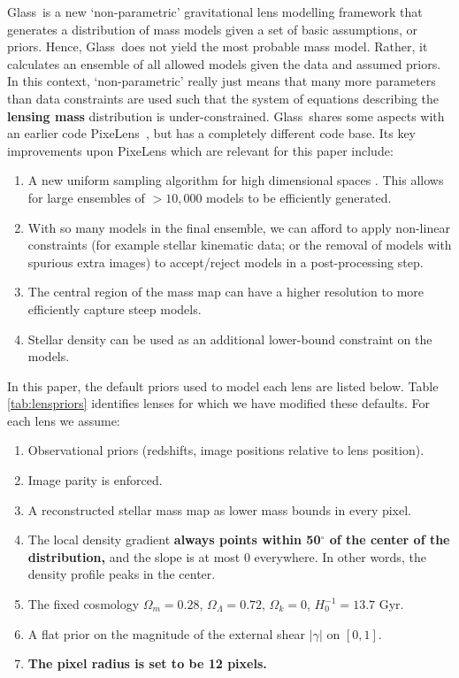 \documentclass[useAMS,usenatbib]{mn2e}
\def\Glass{{\sc Glass}}
\def\PixeLens{{\sc PixeLens}}
\newcommand{\cb}[1]{{\color{red} \textbf{#1}}}
\begin{document}
\Glass\ is a new `non-parametric' gravitational lens modelling framework \citep{2014arXiv1401.7990C} that generates a distribution of mass models given a set of basic assumptions, or priors. Hence, \Glass\ does not yield the most probable mass model. Rather, it calculates an ensemble of all allowed models given the data and assumed priors. In this context, `non-parametric' really just means that many more parameters than data constraints are used such that the system of equations describing the \cb{lensing mass} distribution is under-constrained. \Glass\ shares some aspects with an earlier code \PixeLens\ \citep{2004AJ....127.2604S,2008ApJ...679...17C}, but has a completely different code base. Its key improvements upon \PixeLens{} which are relevant for this paper include:

\begin{enumerate}
\item A new uniform sampling algorithm for high dimensional spaces \citep{2012MNRAS.425.3077L}. This allows for large ensembles of $>10,000$ models to be efficiently generated. 
\item With so many models in the final ensemble, we can afford to apply non-linear constraints (for example stellar kinematic data; or the removal of models with spurious extra images) to accept/reject models in a post-processing step.
\item The central region of the mass map can have a higher resolution to more efficiently capture steep models.
\item Stellar density can be used as an additional lower-bound constraint on the models. 
\end{enumerate} 

In this paper, the default priors used to model each lens are listed below.  Table
\ref{tab:lenspriors} identifies lenses for which we have modified these defaults.
For each lens we assume:

\begin{enumerate} 
\item Observational priors (redshifts, image positions relative to lens position).
\item Image parity is enforced.
\item A reconstructed stellar mass map as lower mass bounds in every pixel.
\item The local density gradient \cb{always points within 50$^{\circ}$ of the center of the distribution,} and the slope is at most 0 everywhere. In other words, the density profile peaks in the center.
\item The fixed cosmology $\Omega_{m} = 0.28$, $\Omega_{\Lambda} = 0.72$, $\Omega_{k} = 0$, $H_{0}^{-1} = 13.7$ Gyr.
\item A flat prior on the magnitude of the external shear $|\gamma|$ on $[0,1]$.
\item \cb{The pixel radius is set to be 12 pixels.}
\end{enumerate}
\end{document}
